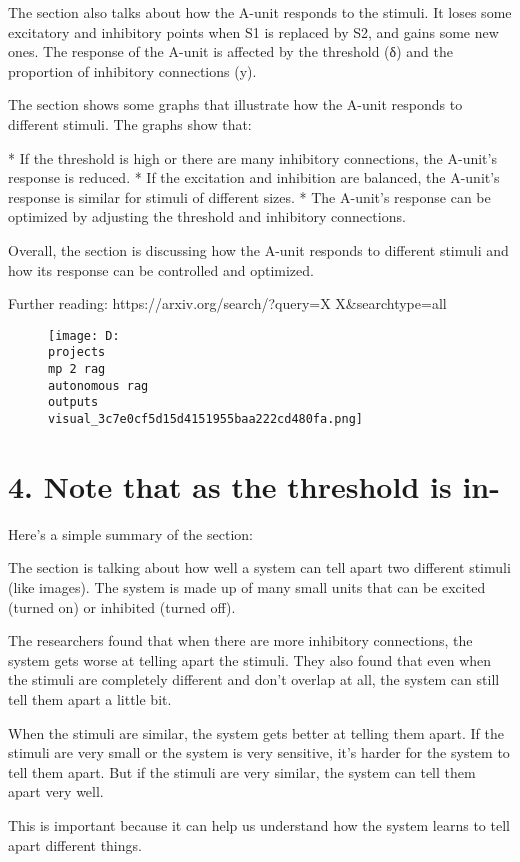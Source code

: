 \documentclass[12pt,a4paper]{article}
\begin{document}
The section also talks about how the A-unit responds to the stimuli. It loses some excitatory and inhibitory points when S1 is replaced by S2, and gains some new ones. The response of the A-unit is affected by the threshold (δ) and the proportion of inhibitory connections (y).

The section shows some graphs that illustrate how the A-unit responds to different stimuli. The graphs show that:

* If the threshold is high or there are many inhibitory connections, the A-unit's response is reduced.
* If the excitation and inhibition are balanced, the A-unit's response is similar for stimuli of different sizes.
* The A-unit's response can be optimized by adjusting the threshold and inhibitory connections.

Overall, the section is discussing how the A-unit responds to different stimuli and how its response can be controlled and optimized.

Further reading: https://arxiv.org/search/?query=X
X&searchtype=all
\begin{figure}[h]
\centering
\texttt{[image: D:\\projects\\mp 2 rag\\autonomous rag\\outputs\\visual\_3c7e0cf5d15d4151955baa222cd480fa.png]}
\end{figure}
\section{4. Note that as the threshold is in-}
Here's a simple summary of the section:

The section is talking about how well a system can tell apart two different stimuli (like images). The system is made up of many small units that can be excited (turned on) or inhibited (turned off).

The researchers found that when there are more inhibitory connections, the system gets worse at telling apart the stimuli. They also found that even when the stimuli are completely different and don't overlap at all, the system can still tell them apart a little bit.

When the stimuli are similar, the system gets better at telling them apart. If the stimuli are very small or the system is very sensitive, it's harder for the system to tell them apart. But if the stimuli are very similar, the system can tell them apart very well.

This is important because it can help us understand how the system learns to tell apart different things.
\end{document}
